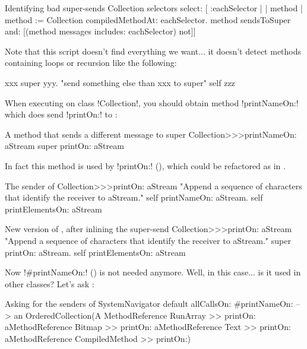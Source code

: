 \documentclass[a4paper,10pt,twoside]{book}
\begin{document}
\begin{script}[findSuperSends]{Identifying bad super-sends}
Collection selectors select: [ :eachSelector |
	| method |
	method := Collection compiledMethodAt: eachSelector.
	method sendsToSuper and: [(method messages includes: eachSelector) not]]
\end{script}

Note that this script doesn't find everything we want... it doesn't detect methods containing loops or recursion like the following:
\begin{code}{}
xxx
	super yyy. "send something else than xxx to super"
	self zzz
\end{code}

When executing  on class \ct!Collection!, you should obtain method \ct!printNameOn:! which does send \ct!printOn:! to \super:
\begin{method}[printNameOn]{A method that sends a different message to super}
Collection>>>printNameOn: aStream
	super printOn: aStream
\end{method}

In fact this method is used by \ct!printOn:! (), which could be refactored as in .

\begin{method}[oldPrintOn]{The sender of }
Collection>>>printOn: aStream
	"Append a sequence of characters that identify the receiver to aStream."
	self printNameOn: aStream.
	self printElementsOn: aStream
\end{method}

\begin{method}[newPrintOn]{New version of , after inlining the  super-send}
Collection>>>printOn: aStream
	"Append a sequence of characters that identify the receiver to aStream."
	super printOn: aStream.
	self printElementsOn: aStream
\end{method}

Now \ct!#printNameOn:! () is not needed anymore. Well, in this case... is it used in other classes? Let's ask \squeak:
\begin{example}[sendersofprintnameon]{Asking for the senders of }{}
SystemNavigator default allCallsOn: #printNameOn:
--> an OrderedCollection(A MethodReference RunArray >> printOn: aMethodReference Bitmap >> printOn: aMethodReference Text >> printOn: aMethodReference CompiledMethod >> printOn:)
\end{example}
\end{document}
